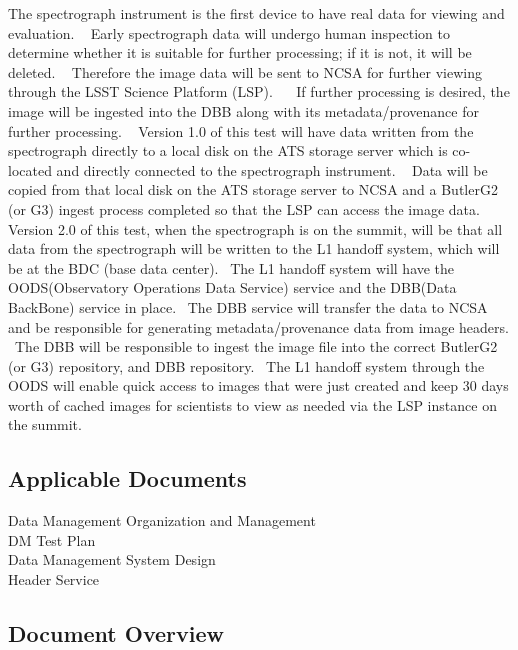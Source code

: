 \documentclass[DM,lsstdraft,STR,toc]{lsstdoc}
\begin{document}
The spectrograph instrument is the first device to have real data for
viewing and evaluation. ~ Early spectrograph data will undergo human
inspection to determine whether it is suitable for further processing;
if it is not, it will be deleted. ~ Therefore the image data will be
sent to NCSA for further viewing through the LSST Science Platform
(LSP). ~ ~If further processing is desired, the image will be ingested
into the DBB along with its metadata/provenance for further processing.
~ Version 1.0 of this test will have data written from the spectrograph
directly to a local disk on the ATS storage server which is co-located
and directly connected to the spectrograph instrument. ~ Data will be
copied from that local disk on the ATS storage server to NCSA and a
ButlerG2 (or G3) ingest process completed so that the LSP can access the
image data. ~ Version 2.0 of this test, when the spectrograph is on the
summit, will be that all data from the spectrograph will be written to
the L1 handoff system, which will be at the BDC (base data center). ~The
L1 handoff system will have the OODS(Observatory Operations Data
Service) service and the DBB(Data BackBone) service in place. ~The DBB
service will transfer the data to NCSA and be responsible for generating
metadata/provenance data from image headers. ~The DBB will be
responsible to ingest the image file into the correct ButlerG2 (or G3)
repository, and DBB repository. ~The L1 handoff system through the OODS
will enable quick access to images that were just created and keep 30
days worth of cached images for scientists to view as needed via the LSP
instance on the summit. ~\\[2\baselineskip]

\subsection{Applicable Documents}\label{applicable-documents}

 Data Management Organization and Management\\
 DM Test Plan\\
 Data Management System Design\\
 Header Service~


\subsection{Document Overview}
\label{sect:docoverview}
\end{document}
